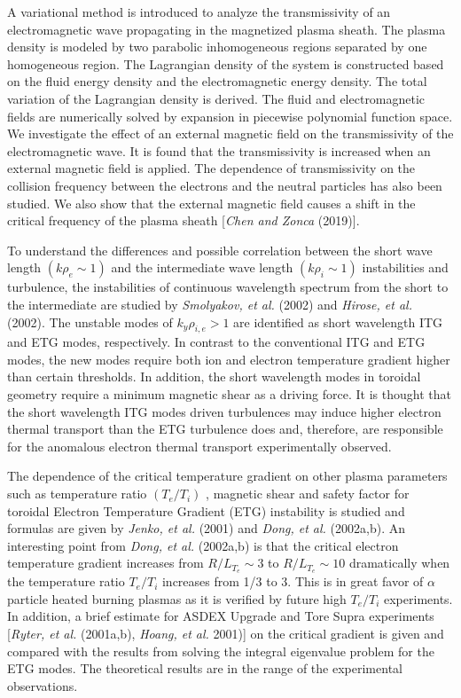 \documentclass[a4paper,openany,12pt]{book}
\begin{document}
A variational method is introduced to analyze the transmissivity of an electromagnetic wave propagating in the magnetized plasma sheath. The plasma density is modeled by two parabolic inhomogeneous regions separated by one homogeneous region. The Lagrangian density of the system is constructed based on the fluid energy density and the electromagnetic energy density. The total variation of the Lagrangian density is derived. The fluid and electromagnetic fields are numerically solved by expansion in piecewise polynomial function space. We investigate the effect of an external magnetic field on the transmissivity of the electromagnetic wave. It is found that the transmissivity is increased when an external magnetic field is applied. The dependence of transmissivity on the collision frequency between the electrons and the neutral particles has also been studied. We also show that the external magnetic field causes a shift in the critical frequency of the plasma sheath [\emph{Chen and Zonca} (2019)].

To understand the differences and possible correlation between the short wave length $(k\rho_e\sim 1)$ and the intermediate wave length $(k\rho_i\sim 1)$ instabilities and turbulence, the instabilities of continuous wavelength spectrum from the short to the intermediate are studied by \emph{Smolyakov, et al.} (2002) and \emph{Hirose, et al.} (2002). The unstable modes of $k_y\rho_{i,e}>1$ are identified as short wavelength ITG and ETG modes, respectively. In contrast to the conventional ITG and ETG modes, the new modes require both ion and electron temperature gradient higher than certain thresholds. In addition, the short wavelength modes in toroidal geometry require a minimum magnetic shear as a driving force. It is thought that the short wavelength ITG modes driven turbulences may induce higher electron thermal transport than the ETG turbulence does and, therefore, are responsible for the anomalous electron thermal transport experimentally observed.

The dependence of the critical temperature gradient on other plasma parameters such as temperature ratio $(T_e/T_i)$ , magnetic shear and safety factor for toroidal Electron Temperature Gradient (ETG) instability is studied and formulas are given by \emph{Jenko, et al.} (2001) and \emph{Dong, et al.} (2002a,b). An interesting point from \emph{Dong, et al.} (2002a,b) is that the critical electron temperature gradient increases from $R/L_{T_e}\sim 3$ to $R/L_{T_e}\sim 10$ dramatically when the temperature ratio $T_e/T_i$ increases from 1/3 to 3. This is in great favor of $\alpha$ particle heated burning plasmas as it is verified by future high $T_e/T_i$ experiments. In addition, a brief estimate for ASDEX Upgrade and Tore Supra experiments [\emph{Ryter, et al.} (2001a,b), \emph{Hoang, et al.} 2001)] on the critical gradient is given and compared with the results from solving the integral eigenvalue problem for the ETG modes. The theoretical results are in the range of the experimental observations.
\end{document}
